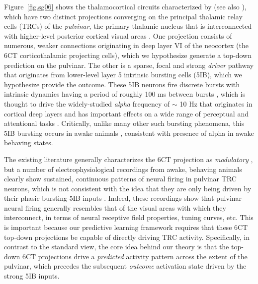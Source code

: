 \documentclass[11pt,twoside]{article}
\newif\myifpdf
\begin{document}
Figure~\ref{fig.sg06} shows the thalamocortical circuits characterized by \citet{ShermanGuillery06} (see also \citealp{ShermanGuillery13,UsreySherman18}), which have two distinct projections converging on the principal thalamic relay cells (TRCs) of the \emph{pulvinar}, the primary thalamic nucleus that is interconnected with higher-level posterior cortical visual areas \citep{Shipp03,ArcaroPinskKastner15,HalassaKastner17}.  One projection consists of numerous, weaker connections originating in deep layer VI of the neocortex (the 6CT corticothalamic projecting cells), which we hypothesize generate a top-down prediction on the pulvinar.  The other is a sparse, focal \citep{Rockland98a,Rockland96} and strong \emph{driver} pathway that originates from lower-level layer 5 intrinsic bursting cells (5IB), which we hypothesize provide the outcome.  These 5IB neurons fire discrete bursts with intrinsic dynamics having a period of roughly 100 ms between bursts \citep{ConnorsGutnickPrince82,SilvaAmitaiConnors91,LarkumZhuSakmann99,FranceschettiGuatteoPanzicaEtAl95,SaalmannPinskWangEtAl12}, which is thought to drive the widely-studied \emph{alpha} frequency of $\sim$ 10 Hz that originates in cortical deep layers and has important effects on a wide range of perceptual and attentional tasks \citep{BuffaloFriesLandmanEtAl11,VanRullenKoch03,MathewsonGrattonFabianiEtAl09,JensenBonnefondVanRullen12,ClaytonYeungKadosh18}.  Critically, unlike many other such bursting phenomena, this 5IB bursting occurs in awake animals \citep{LuczakBarthoHarris09,LuczakBarthoHarris13,SakataHarris09,SakataHarris12}, consistent with presence of alpha in awake behaving states.

The existing literature generally characterizes the 6CT projection as \emph{modulatory} \citep{ShermanGuillery13,UsreySherman18}, but a number of electrophysiological recordings from awake, behaving animals clearly show sustained, continuous patterns of neural firing in pulvinar TRC neurons, which is not consistent with the idea that they are only being driven by their phasic bursting 5IB inputs \citep{Bender82,PetersenRobinsonKeys85,BenderYouakim01,Robinson93,SaalmannPinskWangEtAl12,KomuraNikkuniHirashimaEtAl13,ZhouSchaferDesimone16}.  Indeed, these recordings show that pulvinar neural firing generally resembles that of the visual areas with which they interconnect, in terms of neural receptive field properties, tuning curves, etc.  This is important because our predictive learning framework requires that these 6CT top-down projections be capable of directly driving TRC activity.  Specifically, in contrast to the standard view, the core idea behind our theory is that the top-down 6CT projections drive a \emph{predicted} activity pattern across the extent of the pulvinar, which precedes the subsequent \emph{outcome} activation state driven by the strong 5IB inputs.
\end{document}
